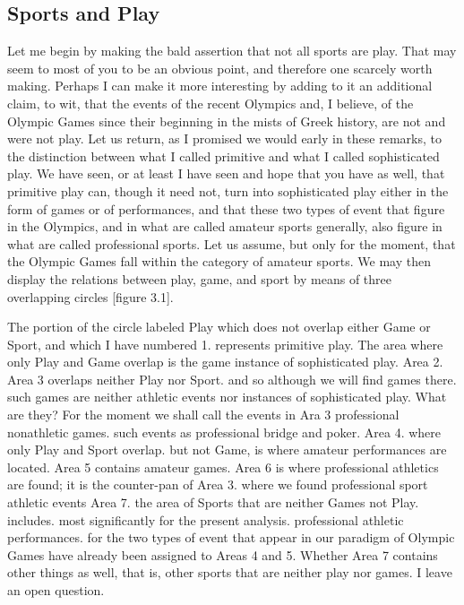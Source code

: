 \documentclass{tufte-handout}
\begin{document}
\subsection{Sports and Play}

Let me begin by making the bald assertion that not all sports are play. That may seem to most of you to be an obvious point, and therefore one scarcely worth making. Perhaps I can make it more interesting by adding to it an additional claim, to wit, that the events of the recent Olympics and, I believe, of the Olympic Games since their beginning in the mists of Greek history, are not and were not play. Let us return, as I promised we would early in these remarks, to the distinction between what I called primitive and what I called sophisticated play. We have seen, or at least I have seen and hope that you have as well, that primitive play can, though it need not, turn into sophisticated play either in the form of games or of performances, and that these two types of event that figure in the Olympics, and in what are called amateur sports generally, also figure in what are called professional sports. Let us assume, but only for the moment, that the Olympic Games fall within the category of amateur sports. We may then display the relations between play, game, and sport by means of three overlapping circles [figure 3.1]. 

The portion of the circle labeled Play which does not overlap either Game or Sport, and which I have numbered 1. represents primitive play. The area where only Play and Game overlap is the game instance of sophisticated play. Area 2. Area 3 overlaps neither Play nor Sport. and so although we will find games there. such games are neither athletic events nor instances of sophisticated play. What are they? For the moment we shall call the events in Ara 3 professional nonathletic games. such events as professional bridge and poker. Area 4. where only Play and Sport overlap. but not Game, is where amateur performances are located. Area 5 contains amateur games. Area 6 is where professional athletics are found; it is the counter-pan of Area 3. where we found professional sport athletic events Area 7. the area of Sports that are neither Games not Play. includes. most significantly for the present analysis. professional athletic performances. for the two types of event that appear in our paradigm of Olympic Games have already been assigned to Areas 4 and 5. Whether Area 7 contains other things as well, that is, other sports that are neither play nor games. I leave an open question.
\end{document}
